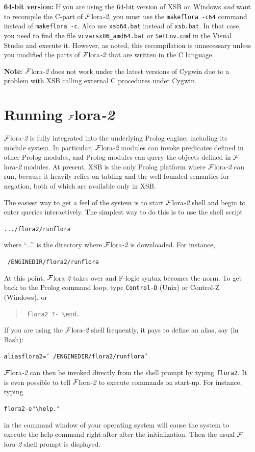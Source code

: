 \documentclass[11pt]{article}
\newcommand{\FLORA}{{\mbox{\sc ${\cal F}${lora}\rm\emph{-2}}}\xspace}
\newcommand{\FLSYSTEM}{\FLORA}
\newcommand{\ENGINENAME}{flora2}
\newcommand{\ENGINERUN}{runflora}
\newcommand{\prompt}{flora2 ?- }
\newcommand{\bs}{\textbackslash}
\newcommand{\fl}{\mbox{F-logic}\xspace}
\begin{document}
{\noindent
\textbf{64-bit version:}  
If you are using the 64-bit version of XSB on Windows \emph{and} want to
recompile the C-part of
\FLSYSTEM, you must use the \texttt{makeflora -c64} command instead of
\texttt{makeflora -c}. Also use \texttt{xsb64.bat} instead of \texttt{xsb.bat}.
In that case, you need to find the file
\texttt{vcvarsx86\_amd64.bat} or \texttt{SetEnv.cmd} in the Visual Studio
and execute it.  
However, as noted, this recompilation is unnecessary unless you modified
the parts of \FLSYSTEM that are written in the C language.

\textbf{Note}: \FLSYSTEM does not work under the latest versions of Cygwin 
due to a problem with XSB calling external C procedures under Cygwin.
}
{}


\section{Running \FLSYSTEM}\label{sec-running}

\FLSYSTEM is fully integrated into the underlying Prolog engine, including its
module system. In particular, \FLSYSTEM modules can invoke predicates defined in
other Prolog modules, and Prolog modules can query the objects defined in
\FLSYSTEM modules. At present, XSB is the only Prolog platform where \FLSYSTEM
can run, because it heavily relies on tabling and the well-founded
semantics for negation, both of which are available only in XSB.


\index{\ENGINERUN script}
\label{runflora-page}
The easiest way to get a feel of the system
is to start \FLSYSTEM shell and begin to enter queries interactively.
The simplest way to do this is to use the shell script
\begin{alltt}
 .../\ENGINENAME/\ENGINERUN  
\end{alltt}
where ``...'' is the directory where \FLSYSTEM is downloaded. For instance,
\begin{alltt}
 ~/ENGINEDIR/\ENGINENAME/\ENGINERUN  
\end{alltt}

At this point, \FLSYSTEM takes over and \fl syntax becomes the
norm. To get back to the Prolog command loop, type {\tt Control-D} 
(Unix) or Control-Z (Windows), or 
\begin{quote}
  \tt
\prompt \bs{}end.  
\end{quote}

\noindent
If you are using the \FLSYSTEM shell frequently, it pays to define an alias, say
(in Bash):
\begin{alltt}
 alias \ENGINENAME='~/ENGINEDIR/\ENGINENAME/\ENGINERUN'
\end{alltt}
\FLSYSTEM can then be invoked directly from the shell prompt by typing
{\tt \ENGINENAME}.
It is even possible to tell \FLSYSTEM to execute commands on start-up.
For instance, typing 
\begin{alltt}
 \ENGINENAME -e "\bs{}help."
\end{alltt}
in the command window of your operating system
will cause the system to execute the help command right after after the
initialization. Then the usual \FLSYSTEM shell prompt is displayed.
\end{document}
